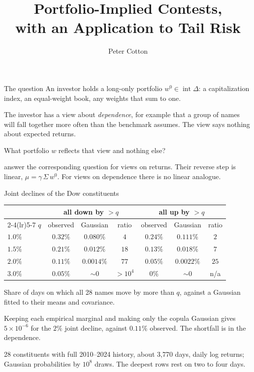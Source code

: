 \documentclass[aspectratio=169,11pt]{beamer}
\title{Portfolio-Implied Contests,\\ with an Application to Tail Risk}
\author{Peter Cotton}
\date{}
\newcommand{\src}[1]{\par\vfill{\scriptsize\color{gray}#1\par}}
\begin{document}
\begin{frame}
\titlepage
\end{frame}

\begin{frame}{The question}
An investor holds a long-only portfolio $w^0 \in \operatorname{int}\Delta$: a
capitalization index, an equal-weight book, any weights that sum to one.

The investor has a view about \emph{dependence}, for example that a group of
names will fall together more often than the benchmark assumes. The view says
nothing about expected returns.

What portfolio $w$ reflects that view and nothing else?

\textcite{black1992} answer the corresponding question for views on returns.
Their reverse step is linear, $\mu = \gamma\,\Sigma\, w^0$. For views on
dependence there is no linear analogue.
\end{frame}

\begin{frame}{Joint declines of the Dow constituents}
\centering
\begin{tabular}{lccc@{\qquad}ccc}
  \toprule
  & \multicolumn{3}{c}{all down by ${>}q$} & \multicolumn{3}{c}{all up by ${>}q$} \\
  \cmidrule(lr){2-4}\cmidrule(lr){5-7}
  $q$ & observed & Gaussian & ratio & observed & Gaussian & ratio \\
  \midrule
  $1.0\%$ & $0.32\%$ & $0.080\%$  & $4$          & $0.24\%$ & $0.111\%$  & $2$  \\
  $1.5\%$ & $0.21\%$ & $0.012\%$  & $18$         & $0.13\%$ & $0.018\%$  & $7$  \\
  $2.0\%$ & $0.11\%$ & $0.0014\%$ & $77$         & $0.05\%$ & $0.0022\%$ & $25$ \\
  $3.0\%$ & $0.05\%$ & ${\sim}0$  & ${>}10^{4}$  & $0\%$    & ${\sim}0$  & n/a  \\
  \bottomrule
\end{tabular}

\raggedright
\medskip
Share of days on which all 28 names move by more than $q$, against a Gaussian
fitted to their means and covariance.

Keeping each empirical marginal and making only the copula Gaussian gives
$5\times10^{-6}$ for the $2\%$ joint decline, against $0.11\%$ observed. The
shortfall is in the dependence.
\src{28 constituents with full 2010--2024 history, about 3{,}770 days, daily log
returns; Gaussian probabilities by $10^8$ draws. The deepest rows rest on two to
four days.}
\end{frame}
\end{document}
